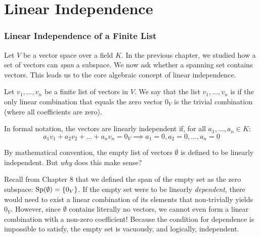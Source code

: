 \renewcommand{\thetheorem}{9.\arabic{theorem}}
\setcounter{theorem}{0}
\setcounter{chapter}{8}
%

\chapter{Linear Independence}

\subsection{Linear Independence of a Finite List}

Let $V$ be a vector space over a field $K$. In the previous chapter, we studied how a set of vectors can \textit{span} a subspace. We now ask whether a spanning set contains  vectors. This leads us to the core algebraic concept of linear independence.

\begin{definition}
\label{def:linear_independence}
Let $v_1, \dots, v_n$ be a finite list of vectors in $V$. We say that the list $v_1, \dots, v_n$ is  if the only linear combination that equals the zero vector $0_V$ is the trivial combination (where all coefficients are zero).

In formal notation, the vectors are linearly independent if, for all $a_1, \dots, a_n \in K$:
\[
a_1 v_1 + a_2 v_2 + \dots + a_n v_n = 0_V \implies a_1 = 0, a_2 = 0, \dots, a_n = 0
\]
\end{definition}

\begin{remark}
\label{rem:empty_list_independent}
By mathematical convention, the empty list of vectors $\emptyset$ is defined to be linearly independent. But \textit{why} does this make sense? 

Recall from Chapter 8 that we defined the span of the empty set as the zero subspace: $\operatorname{Sp}(\emptyset) = \{0_V\}$. If the empty set were to be linearly \textit{dependent}, there would need to exist a linear combination of its elements that non-trivially yields $0_V$. However, since $\emptyset$ contains literally no vectors, we cannot even form a linear combination with a non-zero coefficient! Because the condition for dependence is impossible to satisfy, the empty set is vacuously, and logically, independent.
\end{remark}

